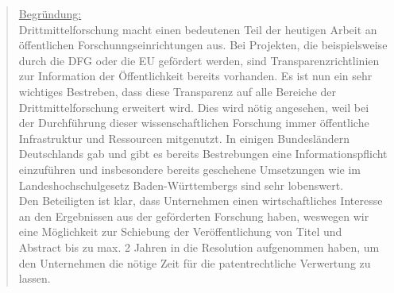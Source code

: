 \documentclass[10pt,oneside]{scrartcl}
\begin{document}
\begin{quote}
\underline{Begründung:}\\
Drittmittelforschung macht einen bedeutenen Teil der heutigen Arbeit an öffentlichen Forschunngseinrichtungen aus. Bei Projekten, die beispielsweise durch die DFG oder die EU gefördert werden, sind Transparenzrichtlinien zur Information der Öffentlichkeit bereits vorhanden. Es ist nun ein sehr wichtiges Bestreben, dass diese Transparenz auf alle Bereiche der Drittmittelforschung erweitert wird. Dies wird nötig angesehen, weil bei der Durchführung dieser wissenschaftlichen Forschung immer öffentliche Infrastruktur und Ressourcen mitgenutzt. In einigen Bundesländern Deutschlands gab und gibt es bereits Bestrebungen eine Informationspflicht einzuführen und insbesondere bereits geschehene Umsetzungen wie im Landeshochschulgesetz Baden-Württembergs sind sehr lobenswert.\\
Den Beteiligten ist klar, dass Unternehmen einen wirtschaftliches Interesse an den Ergebnissen aus der geförderten Forschung haben, weswegen wir eine Möglichkeit zur Schiebung der Veröffentlichung von Titel und Abstract bis zu max. 2 Jahren in die Resolution aufgenommen haben, um den Unternehmen die nötige Zeit für die patentrechtliche Verwertung zu lassen.

\end{quote}
\end{document}
